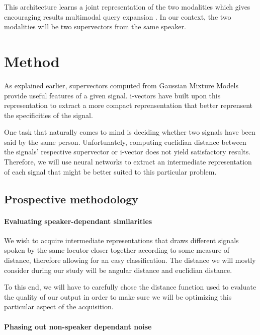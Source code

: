 \documentclass[conference]{IEEEtran}
\begin{document}
This architecture learns a joint representation of the two modalities which gives encouraging results multimodal query expansion \cite{vukotic:hal-01314302}. In our context, the two modalities will be two supervectors from the same speaker.

\section{Method}
\label{sec:Method}

As explained earlier, supervectors computed from Gaussian Mixture Models provide
useful features of a given signal. i-vectors have built upon this representation
to extract a more compact reprensentation that better reprensent the
specificities of the signal.

One task that naturally comes to mind is deciding whether two signals have been
said by the same person. Unfortunately, computing euclidian distance between the signals'
respective supervector or i-vector does not yield satisfactory results.
Therefore, we will use neural networks to extract an intermediate representation
of each signal that might be better suited to this particular problem.

\subsection{Prospective methodology}
\label{subsec:prosp}

\paragraph{Evaluating speaker-dependant similarities}

We wish to acquire intermediate representations that draws different signals
spoken by the same locutor closer together according to some measure of
distance, therefore allowing for an easy classification. The distance we will
mostly consider during our study will be angular distance and euclidian
distance.

To this end, we will have to carefully chose the distance function used to
evaluate the \og quality\fg{} of our output in order to make sure we will be
optimizing this particular aspect of the acquisition.

\paragraph{Phasing out non-speaker dependant noise}
\end{document}
